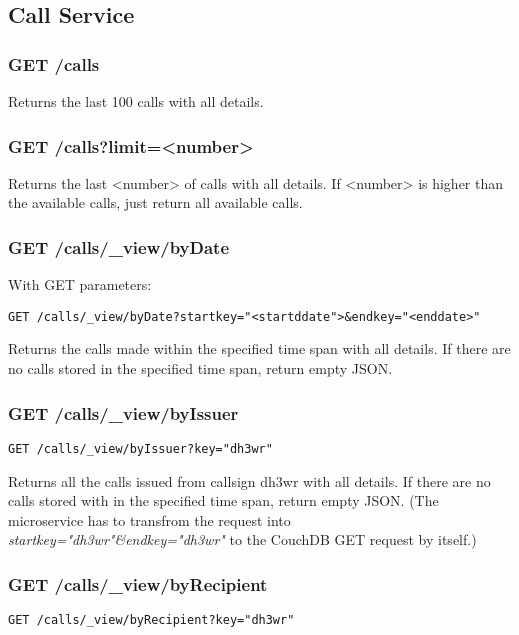 \subsection{Call Service}

\subsubsection{GET /calls}
Returns the last 100 calls with all details.

\subsubsection{GET /calls?limit=<number>}

Returns the last <number> of calls with all details. If <number> is higher than the available calls, just return all available calls.

\subsubsection{GET /calls/\_view/byDate}
With GET parameters:

\begin{verbatim}
GET /calls/_view/byDate?startkey="<startddate">&endkey="<enddate>"
\end{verbatim}

Returns the calls made within the specified time span with all details. If there are no calls stored in the specified time span, return empty JSON.

\subsubsection{GET /calls/\_view/byIssuer}
\begin{verbatim}
GET /calls/_view/byIssuer?key="dh3wr"
\end{verbatim}

Returns all the calls issued from callsign dh3wr with all details. If there are no calls stored with in the specified time span, return empty JSON. (The microservice has to transfrom the request into \textit{startkey="dh3wr"\&endkey="dh3wr"} to the CouchDB GET request by itself.)

\subsubsection{GET /calls/\_view/byRecipient}
\begin{verbatim}
GET /calls/_view/byRecipient?key="dh3wr"
\end{verbatim}

